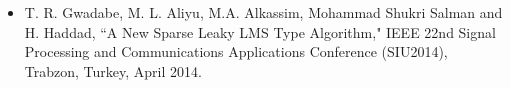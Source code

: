 \vspace{-1cm}
\begin{itemize}
\item T. R. Gwadabe, M. L. Aliyu, M.A. Alkassim, Mohammad Shukri Salman and H. Haddad, ``A New Sparse Leaky LMS Type Algorithm," IEEE 22nd Signal Processing and Communications Applications Conference (SIU2014), Trabzon, Turkey, April 2014.
\end{itemize}






